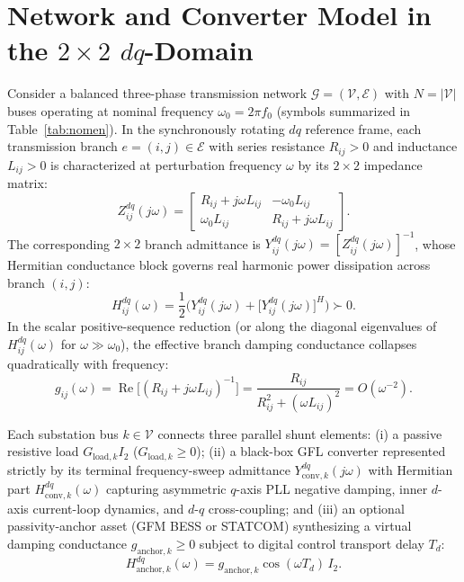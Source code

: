 \documentclass[10pt,twocolumn]{article}
\begin{document}
\section{Network and Converter Model in the $2\times 2$ $dq$-Domain}
Consider a balanced three-phase transmission network $\mathcal{G}=(\mathcal{V},\mathcal{E})$ with $N=|\mathcal{V}|$ buses operating at nominal frequency $\omega_0=2\pi f_0$ (symbols summarized in Table~\ref{tab:nomen}). In the synchronously rotating $dq$ reference frame, each transmission branch $e=(i,j)\in\mathcal{E}$ with series resistance $R_{ij}>0$ and inductance $L_{ij}>0$ is characterized at perturbation frequency $\omega$ by its $2\times 2$ impedance matrix:
\begin{equation}
Z_{ij}^{dq}(j\omega) = \begin{bmatrix} R_{ij}+j\omega L_{ij} & -\omega_0 L_{ij} \\ \omega_0 L_{ij} & R_{ij}+j\omega L_{ij} \end{bmatrix}.
\label{eq:zdq}
\end{equation}
The corresponding $2\times 2$ branch admittance is $Y_{ij}^{dq}(j\omega) = [Z_{ij}^{dq}(j\omega)]^{-1}$, whose Hermitian conductance block governs real harmonic power dissipation across branch $(i,j)$:
\begin{equation}
H_{ij}^{dq}(\omega) = \frac{1}{2}\Big(Y_{ij}^{dq}(j\omega) + \big[Y_{ij}^{dq}(j\omega)\big]^H\Big) \succ 0.
\label{eq:hdq}
\end{equation}
In the scalar positive-sequence reduction (or along the diagonal eigenvalues of $H_{ij}^{dq}(\omega)$ for $\omega \gg \omega_0$), the effective branch damping conductance collapses quadratically with frequency:
\begin{equation}
g_{ij}(\omega) = \operatorname{Re}\!\big[(R_{ij}+j\omega L_{ij})^{-1}\big] = \frac{R_{ij}}{R_{ij}^2 + (\omega L_{ij})^2} = O(\omega^{-2}).
\label{eq:gij}
\end{equation}

Each substation bus $k\in\mathcal{V}$ connects three parallel shunt elements: (i) a passive resistive load $G_{\text{load},k} I_2$ ($G_{\text{load},k}\ge 0$); (ii) a black-box GFL converter represented strictly by its terminal frequency-sweep admittance $Y_{\text{conv},k}^{dq}(j\omega)$ with Hermitian part $H_{\text{conv},k}^{dq}(\omega)$ capturing asymmetric $q$-axis PLL negative damping, inner $d$-axis current-loop dynamics, and $d$-$q$ cross-coupling; and (iii) an optional passivity-anchor asset (GFM BESS or STATCOM) synthesizing a virtual damping conductance $g_{\text{anchor},k}\ge 0$ subject to digital control transport delay $T_d$:
\begin{equation}
H_{\text{anchor},k}^{dq}(\omega) = g_{\text{anchor},k}\cos(\omega T_d)\, I_2.
\label{eq:hanchor}
\end{equation}
\end{document}
